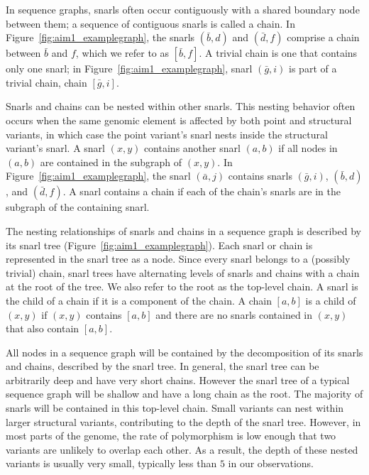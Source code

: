 \documentclass[11pt]{ucscthesis}
\begin{document}
In sequence graphs, snarls often occur contiguously with a shared boundary node between them; a sequence of contiguous snarls is called a chain.
In Figure~\ref{fig:aim1_examplegraph}, the snarls $(\bar{b}, d)$ and $(\bar{d}, f)$ comprise a chain between $\bar{b}$ and $f$, which we refer to as $[\bar{b}, f]$.
A trivial chain is one that contains only one snarl; in Figure~\ref{fig:aim1_examplegraph}, snarl $(\bar{g}, i)$ is part of a trivial chain, chain $[\bar{g}, i]$.

Snarls and chains can be nested within other snarls. 
This nesting behavior often occurs when the same genomic element is affected by both point and structural variants, in which case the point variant's snarl nests inside the structural variant's snarl.
A snarl $(x, y)$ contains another snarl $(a, b)$ if all nodes in $(a, b)$ are contained in the subgraph of $(x, y)$.
In Figure~\ref{fig:aim1_examplegraph}, the snarl $(\bar{a}, j)$ contains snarls $(\bar{g}, i)$, $(\bar{b}, d)$, and $(\bar{d}, f)$.
A snarl contains a chain if each of the chain's snarls are in the subgraph of the containing snarl.

The nesting relationships of snarls and chains in a sequence graph is described by its snarl tree (Figure~\ref{fig:aim1_examplegraph}).
Each snarl or chain is represented in the snarl tree as a node. 
Since every snarl belongs to a (possibly trivial) chain, snarl trees have alternating levels of snarls and chains with a chain at the root of the tree.
We also refer to the root as the top-level chain.
A snarl is the child of a chain if it is a component of the chain.
A chain $[a, b]$ is a child of $(x, y)$ if $(x, y)$ contains $[a, b]$ and there are no snarls contained in $(x, y)$ that also contain $[a, b]$.


All nodes in a sequence graph will be contained by the decomposition of its snarls and chains, described by the snarl tree.
In general, the snarl tree can be arbitrarily deep and have very short chains.
However the snarl tree of a typical sequence graph will be shallow and have a long chain as the root.
The majority of snarls will be contained in this top-level chain. Small variants can nest within larger structural variants, contributing to the depth of the snarl tree.
However, in most parts of the genome, the rate of polymorphism is low enough that two variants are unlikely to overlap each other.
As a result, the depth of these nested variants is usually very small, typically less than $5$ in our observations.
\end{document}
